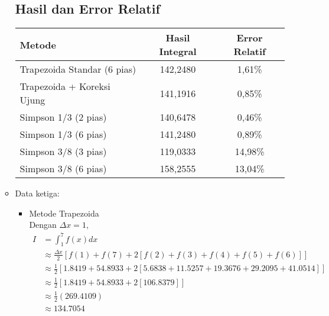 \documentclass{article}
\begin{document}
\begin{enumerate}
\begin{itemize}
        \subsection*{Hasil dan Error Relatif}
        \begin{center}
        \begin{tabular}{|l|c|c|}
        \hline
        \textbf{Metode} & \textbf{Hasil Integral} & \textbf{Error Relatif} \\ \hline
        Trapezoida Standar (6 pias) & 142,2480 & 1,61\% \\ \hline
        Trapezoida + Koreksi Ujung & 141,1916 & 0,85\% \\ \hline
        Simpson 1/3 (2 pias) & 140,6478 & 0,46\% \\ \hline
        Simpson 1/3 (6 pias) & 141,2480 & 0,89\% \\ \hline
        Simpson 3/8 (3 pias) & 119,0333 & 14,98\% \\ \hline
        Simpson 3/8 (6 pias) & 158,2555 & 13,04\% \\ \hline
        \end{tabular}
        \end{center}

    
        \item Data ketiga: \\
        \begin{itemize}
            \item Metode Trapezoida \\
            Dengan $\Delta x = 1,$
            \begin{align*}
                I &= \int_{1}^{7} f(x) dx \\
                &\approx \frac{\Delta x}{2} \left [f(1) + f(7) + 2 \left [f(2) + f(3) + f(4) + f(5) + f(6)\right ] \right ] \\
                &\approx \frac{1}{2} \left [\num{1,8419} + \num{54,8933} + 2 \left [\num{5,6838} + \num{11,5257} + \num{19,3676} + \num{29,2095} + \num{41,0514}\right ] \right ] \\
                &\approx \frac{1}{2} \left [\num{1,8419} + \num{54,8933} + 2 \left [\num{106,8379}\right ] \right ] \\
                &\approx \frac{1}{2} (\num{269,4109}) \\
                &\approx \num{134,7054}
            \end{align*}


\end{itemize}
\end{itemize}
\end{enumerate}
\end{document}
